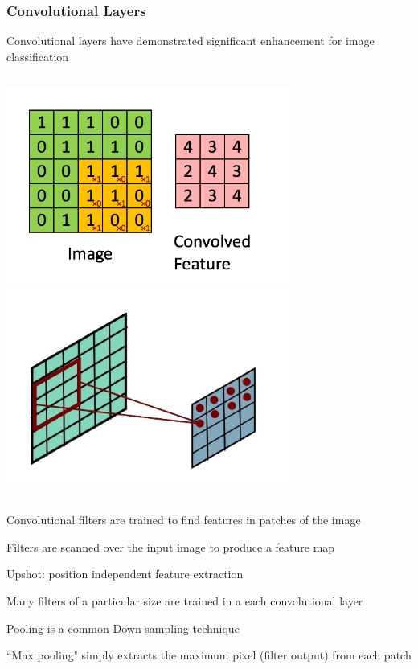 \documentclass[10pt,professionalfonts,xcolor=table]{beamer}
\begin{document}
\begin{frame}
\frametitle{Convolutional Layers}


  \bangon
  \item Convolutional layers have demonstrated significant enhancement for image classification
  \bangoff
  \begin{columns}[c]
  \centering \includegraphics[width=0.7\textwidth]{figures/figures/conv.png}
  \centering \includegraphics[width=0.7\textwidth]{figures/figures/conv3d.png}
  \end{columns}
  \bangon
  \gap
  \item Convolutional filters are trained to find features in patches of the image
  \gap
  \item Filters are scanned over the input image to produce a feature map
    \bangon
    \item Upshot: position independent feature extraction
    \bangoff
  \gap
  \item Many filters of a particular size are trained in a each convolutional layer
  \gap
  \item Pooling is a common Down-sampling technique
    \bangon
    \item ``Max pooling" simply extracts the maximum pixel (filter output) from each patch
    \bangoff
  \bangoff

\end{frame}
\end{document}
